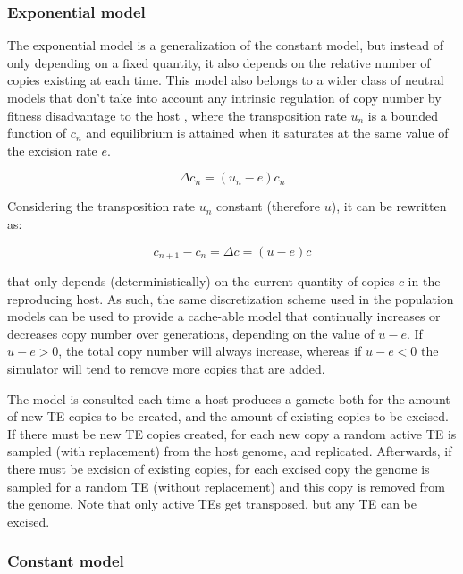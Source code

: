 \documentclass[10pt]{article}
\begin{document}
\subsubsection{Exponential model}

The exponential model is a generalization of the constant model, but
instead of only depending on a fixed quantity, it also depends on the
relative number of copies existing at each time. This model also
belongs to a wider class of neutral models that don't take into
account any intrinsic regulation of copy number by fitness
disadvantage to the host \cite{rouzic2005}, where the transposition
rate $u_n$ is a bounded function of $c_n$ and equilibrium is attained
when it saturates at the same value of the excision rate $e$.

\begin{equation}
  \Delta c_n = (u_n - e) c_n
\end{equation}

Considering the transposition rate $u_n$ constant (therefore $u$), it
can be rewritten as:

\begin{equation}
 c_{n+1} - c_n = \Delta c = (u - e) c
\end{equation}

that only depends (deterministically) on the current quantity of
copies $c$ in the reproducing host. As such, the same discretization
scheme used in the population models can be used to provide a
cache-able model that continually increases or decreases copy number
over generations, depending on the value of $u-e$. If $u-e >0$, the
total copy number will always increase, whereas if $u-e<0$ the
simulator will tend to remove more copies that are added.

The model is consulted each time a host produces a gamete both for the
amount of new TE copies to be created, and the amount of existing
copies to be excised. If there must be new TE copies created, for each
new copy a random active TE is sampled (with replacement) from the
host genome, and replicated. Afterwards, if there must be excision of
existing copies, for each excised copy the genome is sampled for a
random TE (without replacement) and this copy is removed from the
genome. Note that only active TEs get transposed, but any TE can be
excised.

\subsubsection{Constant model}
\end{document}
